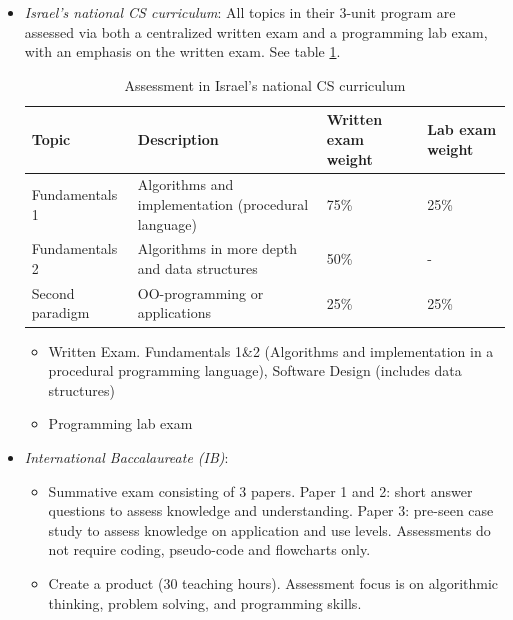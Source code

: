 \begin{itemize}
%

\item \emph{Israel's national CS curriculum}:
    All topics in their 3-unit program are assessed via both a centralized written exam and a programming lab exam, with an emphasis on the written exam.\cite{ezer1999curriculum} See table \ref{table:IsraelAssessment}.

\begin{table}
  \centering
\begin{tabular}{|l|p{70mm}|p{20mm}|p{20mm}|}
  \hline

  \textbf{Topic} & \textbf{Description} & \textbf{Written exam weight} &  \textbf{Lab exam weight} \\
  \hline
Fundamentals 1 & Algorithms and implementation (procedural language)& 75\% & 25\% \\ \hline
Fundamentals 2 & Algorithms in more depth and data structures & 50\% & - \\ \hline
Second paradigm & OO-programming or applications & 25\% & 25\% \\
  \hline
\end{tabular}
\caption{Assessment in Israel's national CS curriculum}\label{table:IsraelAssessment}
\end{table}

    \begin{itemize}
    \item Written Exam. Fundamentals 1\&2 (Algorithms and implementation in a procedural programming language), Software Design (includes data structures)
    \item Programming lab exam
    \end{itemize}

\item \emph{International Baccalaureate (IB)}:
    \begin{itemize}
    \item Summative exam consisting of 3 papers. Paper 1 and 2: short answer questions to assess knowledge and understanding.
	Paper 3: pre-seen case study to assess knowledge on application and use levels. Assessments do not require coding, pseudo-code and flowcharts only.

    \item Create a product (30 teaching hours). Assessment focus is on algorithmic thinking, problem solving, and programming skills.


\end{itemize}
\end{itemize}
